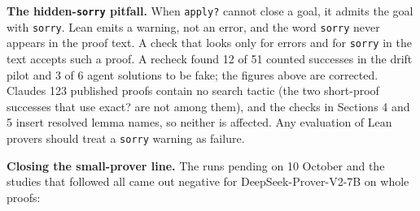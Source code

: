 \documentclass[11pt,a4paper]{article}
\begin{document}
\textbf{The hidden-\texttt{sorry} pitfall.} When \texttt{apply?} cannot close a goal, it admits the goal with \texttt{sorry}. Lean emits a warning, not an error, and the word \texttt{sorry} never appears in the proof text. A check that looks only for errors and for \texttt{sorry} in the text accepts such a proof. A recheck found 12 of 51 counted successes in the drift pilot and 3 of 6 agent solutions to be fake; the figures above are corrected. Claude\textquotesingle s 123 published proofs contain no search tactic (the two short-proof successes that use exact? are not among them), and the checks in Sections 4 and 5 insert resolved lemma names, so neither is affected. Any evaluation of Lean provers should treat a \texttt{sorry} warning as failure.

\textbf{Closing the small-prover line.} The runs pending on 10 October and the studies that followed all came out negative for DeepSeek-Prover-V2-7B on whole proofs:
\end{document}
